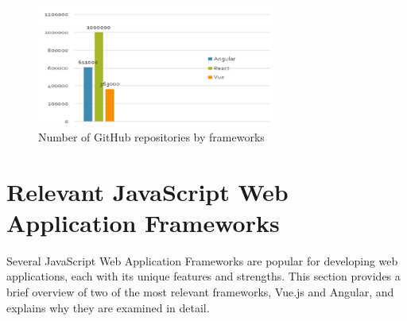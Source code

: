 \begin{figure}[h!]
    \centering
    \includegraphics[width=0.7\textwidth]{image.png}
    \caption{Number of GitHub repositories by frameworks~\cite{cincovic2020comparison}}
    \label{fig:github_repos}
\end{figure}
    



\section{Relevant JavaScript Web Application Frameworks}

Several JavaScript Web Application Frameworks are popular for developing web applications, each with its unique features and strengths. This section provides a brief overview of two of the most relevant frameworks, Vue.js and Angular, and explains why they are examined in detail.


